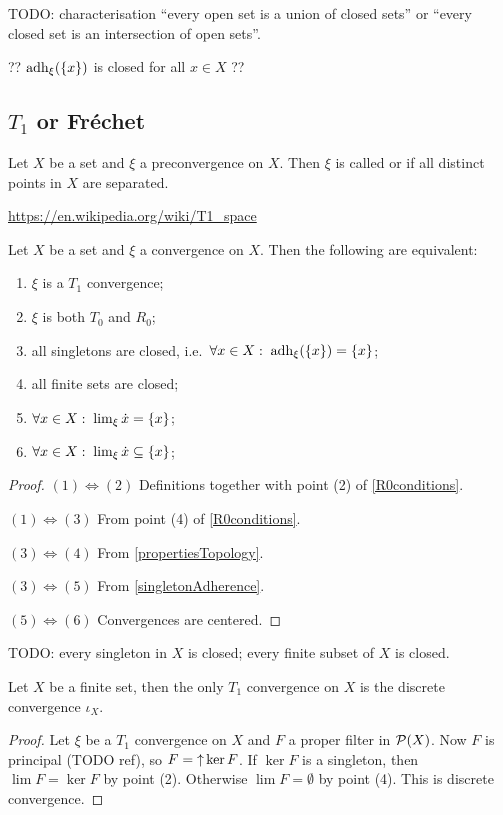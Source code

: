 TODO: characterisation  ``every open set is a union of closed sets'' or
``every closed set is an intersection of open sets''.

?? $\operatorname{adh}_\xi(\{x\})$ is closed for all $x\in X$ ??

\subsection{$T_1$ or Fréchet}
\begin{definition}
Let $X$ be a set and $\xi$ a preconvergence on $X$. Then $\xi$ is called  or  if all distinct points in $X$ are separated.
\end{definition}
\url{https://en.wikipedia.org/wiki/T1_space}

\begin{proposition} \label{FrechetCharacterisation}
Let $X$ be a set and $\xi$ a convergence on $X$. Then the following are equivalent:
\begin{enumerate}
\item $\xi$ is a $T_1$ convergence;
\item $\xi$ is both $T_0$ and $R_0$;
\item all singletons are closed, i.e.\ $\forall x\in X: \; \operatorname{adh}_\xi(\{x\}) = \{x\}$;
\item all finite sets are closed;
\item $\forall x\in X: \; \lim_\xi\dot{x} = \{x\}$;
\item $\forall x\in X: \; \lim_\xi \dot{x} \subseteq \{x\}$;
\end{enumerate}
\end{proposition}
\begin{proof}
$(1) \Leftrightarrow (2)$ Definitions together with point (2) of \ref{R0conditions}.

$(1) \Leftrightarrow (3)$ From point (4) of \ref{R0conditions}.

$(3) \Leftrightarrow (4)$ From \ref{propertiesTopology}.

$(3) \Leftrightarrow (5)$ From \ref{singletonAdherence}.

$(5) \Leftrightarrow (6)$ Convergences are centered.
\end{proof}
TODO: every singleton in $X$ is closed;  every finite subset of $X$ is closed.
\begin{corollary} \label{finiteConvergenceDiscrete}
Let $X$ be a finite set, then the only $T_1$ convergence on $X$ is the discrete convergence $\iota_X$.
\end{corollary}
\begin{proof}
Let $\xi$ be a $T_1$ convergence on $X$ and $F$ a proper filter in $\operatorname{\mathcal{P}}(X)$. Now $F$ is principal (TODO ref), so $F = \operatorname{\uparrow} \ker F$. If $\ker F$ is a singleton, then $\lim F = \ker F$ by point (2). Otherwise $\lim F = \emptyset$ by point (4). This is discrete convergence.
\end{proof}

